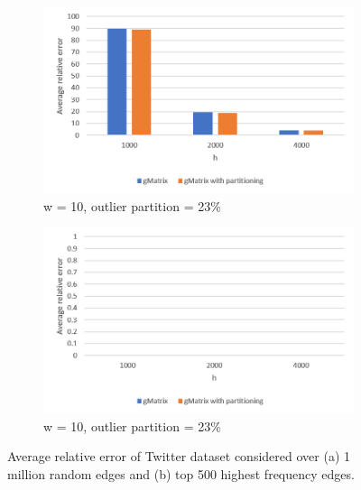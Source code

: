 \begin{figure}[!htbp]
\centering
\begin{subfigure}{.5\textwidth}
  \centering
  \includegraphics[width=1\linewidth]{T2}
  \caption{w = 10, outlier partition = 23\%}
  \label{fig:sub1}
\end{subfigure}%
\begin{subfigure}{.5\textwidth}
  \centering
  \includegraphics[width=1\linewidth]{T2T}
  \caption{w = 10, outlier partition = 23\%}
  \label{fig:sub2}
\end{subfigure}
\caption{Average relative error of Twitter dataset considered over (a) 1 million random edges and (b) top 500 highest frequency edges.}
\label{fig:t2}
\end{figure}

